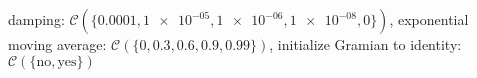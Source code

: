 damping: $\mathcal{C}(\{\num[scientific-notation=true]{0.0001},\num[scientific-notation=true]{1e-05},\num[scientific-notation=true]{1e-06},\num[scientific-notation=true]{1e-08},\num[scientific-notation=false]{0}\})$, exponential moving average: $\mathcal{C}(\{\num[scientific-notation=false]{0},\num[scientific-notation=true]{0.3},\num[scientific-notation=true]{0.6},\num[scientific-notation=true]{0.9},\num[scientific-notation=true]{0.99}\})$, initialize Gramian to identity: $\mathcal{C}(\{\text{no},\text{yes}\})$